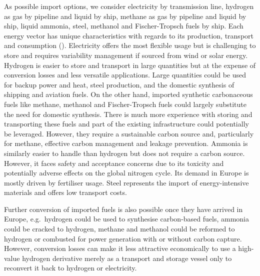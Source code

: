 
As possible import options, we consider electricity by transmission line,
hydrogen as gas by pipeline and liquid by ship, methane as gas by pipeline and
liquid by ship, liquid ammonia, steel, methanol and Fischer-Tropsch fuels by
ship. Each energy vector has unique characteristics with regards to its
production, transport and consumption
(). Electricity offers the most
flexible usage but is challenging to store and requires variability management
if sourced from wind or solar energy. Hydrogen is easier to store and transport
in large quantities but at the expense of conversion losses and less versatile
applications. Large quantities could be used for backup power and heat, steel
production, and the domestic synthesis of shipping and aviation fuels. On the
other hand, imported synthetic carbonaceous fuels like methane, methanol and
Fischer-Tropsch fuels could largely substitute the need for domestic synthesis.
There is much more experience with storing and transporting these fuels and part
of the existing infrastructure could potentially be leveraged. However, they
require a sustainable carbon source and, particularly for methane, effective
carbon management and leakage
prevention.\cite{shirizadehImpactMethaneLeakage2023} Ammonia is similarly easier
to handle than hydrogen but does not require a carbon source. However, it faces
safety and acceptance concerns due to its toxicity and potentially adverse
effects on the global nitrogen
cycle.\cite{bertagniMinimizingImpactsAmmonia2023,wolframUsingAmmoniaShipping2022}
Its demand in Europe is mostly driven by fertiliser usage. Steel represents the
import of energy-intensive materials and offers low transport costs.

Further conversion of imported fuels is also possible once they have arrived in
Europe, e.g.~hydrogen could be used to synthesise carbon-based fuels, ammonia
could be cracked to hydrogen, methane and methanol could be reformed to hydrogen
or combusted for power generation with or without carbon capture. However,
conversion losses can make it less attractive economically to use a high-value
hydrogen derivative merely as a transport and storage vessel only to reconvert
it back to hydrogen or electricity.


